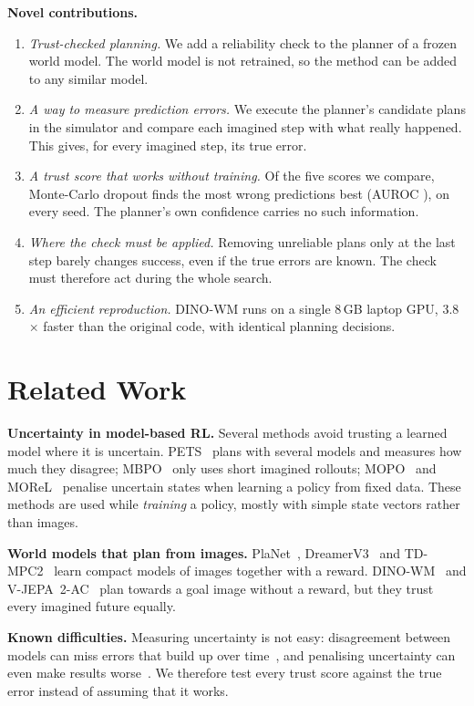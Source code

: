 \documentclass[conference]{IEEEtran}
\begin{document}
\textbf{Novel contributions.}
\begin{enumerate}
\item \emph{Trust-checked planning.} We add a reliability check to the planner of a frozen world model. The world model
is not retrained, so the method can be added to any similar model.
\item \emph{A way to measure prediction errors.} We execute the planner's candidate plans in the simulator and compare
each imagined step with what really happened. This gives, for every imagined step, its true error.
\item \emph{A trust score that works without training.} Of the five scores we compare, Monte-Carlo dropout finds the
most wrong predictions best (AUROC \HMC{}), on every seed. The planner's own confidence carries no such information.
\item \emph{Where the check must be applied.} Removing unreliable plans only at the last step barely changes success,
even if the true errors are known. The check must therefore act during the whole search.
\item \emph{An efficient reproduction.} DINO-WM runs on a single 8\,GB laptop GPU, 3.8$\times$ faster than the original
code, with identical planning decisions.
\end{enumerate}

\section{Related Work}

\textbf{Uncertainty in model-based RL.} Several methods avoid trusting a learned model where it is uncertain. PETS~\cite{ref6}
plans with several models and measures how much they disagree; MBPO~\cite{ref8} only uses short imagined rollouts;
MOPO~\cite{ref9} and MOReL~\cite{ref10} penalise uncertain states when learning a policy from fixed data. These methods
are used while \emph{training} a policy, mostly with simple state vectors rather than images.

\textbf{World models that plan from images.} PlaNet~\cite{ref7}, DreamerV3~\cite{ref12} and TD-MPC2~\cite{ref13} learn
compact models of images together with a reward. DINO-WM~\cite{ref1} and V-JEPA~2-AC~\cite{ref2} plan towards a goal
image without a reward, but they trust every imagined future equally.

\textbf{Known difficulties.} Measuring uncertainty is not easy: disagreement between models can miss errors that build
up over time~\cite{ref17}, and penalising uncertainty can even make results worse~\cite{ref18}. We therefore test every
trust score against the true error instead of assuming that it works.
\end{document}
